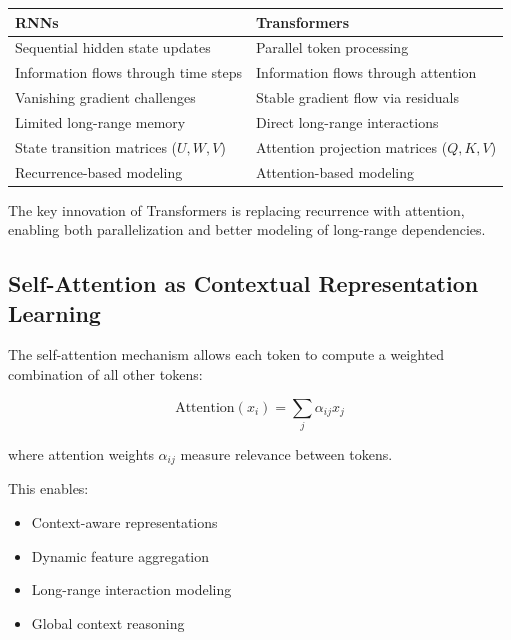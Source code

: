 \documentclass[11pt]{article}
\begin{document}
\begin{center}

\begin{tabular}{p{5.5cm}p{5.5cm}}

\hline

\textbf{RNNs} & \textbf{Transformers} \\

\hline

Sequential hidden state updates & Parallel token processing \\

Information flows through time steps & Information flows through attention \\

Vanishing gradient challenges & Stable gradient flow via residuals \\

Limited long-range memory & Direct long-range interactions \\

State transition matrices ($U,W,V$) & Attention projection matrices ($Q,K,V$) \\

Recurrence-based modeling & Attention-based modeling \\

\hline

\end{tabular}

\end{center}

The key innovation of Transformers is replacing recurrence with attention, enabling both parallelization and better modeling of long-range dependencies.

\subsection{Self-Attention as Contextual Representation Learning}

The self-attention mechanism allows each token to compute a weighted combination of all other tokens:

\[
\text{Attention}(x_i)
=
\sum_j \alpha_{ij} x_j
\]

where attention weights $\alpha_{ij}$ measure relevance between tokens.

This enables:

\begin{itemize}

\item Context-aware representations
\item Dynamic feature aggregation
\item Long-range interaction modeling
\item Global context reasoning

\end{itemize}
\end{document}
